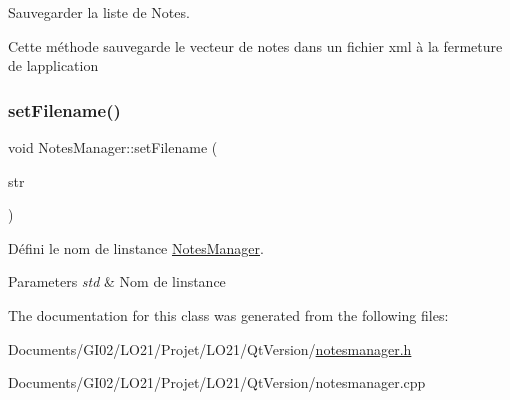 Sauvegarder la liste de Notes. 

Cette méthode sauvegarde le vecteur de notes dans un fichier xml à la fermeture de l\textquotesingle{}application \mbox{\label{class_notes_manager_aaa57ac37417937f81173c0ad93298a2a}} 
\subsubsection{\texorpdfstring{set\+Filename()}{setFilename()}}
{\footnotesize\ttfamily void Notes\+Manager\+::set\+Filename (\begin{DoxyParamCaption}\item[{const Q\+String \&}]{str }\end{DoxyParamCaption})\hspace{0.3cm}{\ttfamily [inline]}}



Défini le nom de l\textquotesingle{}instance \hyperlink{class_notes_manager}{Notes\+Manager}. 


\begin{DoxyParams}{Parameters}
{\em std} & Nom de l\textquotesingle{}instance \\
\hline
\end{DoxyParams}


The documentation for this class was generated from the following files\+:\begin{DoxyCompactItemize}
\item 
Documents/\+G\+I02/\+L\+O21/\+Projet/\+L\+O21/\+Qt\+Version/\hyperlink{notesmanager_8h}{notesmanager.\+h}\item 
Documents/\+G\+I02/\+L\+O21/\+Projet/\+L\+O21/\+Qt\+Version/notesmanager.\+cpp\end{DoxyCompactItemize}
